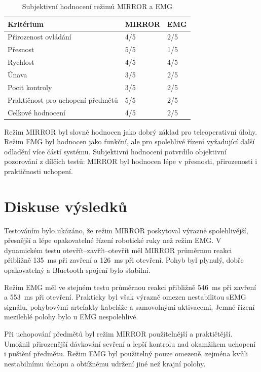 \begin{table}[htbp]
\centering
\caption{Subjektivní hodnocení režimů MIRROR a EMG}
\label{tab:subjektivni-hodnoceni}
\begin{tabular}{|p{}|p{}|p{}|}
\hline
\textbf{Kritérium} & \textbf{MIRROR} & \textbf{EMG} \\
\hline
Přirozenost ovládání & 4/5 & 2/5 \\
\hline
Přesnost & 5/5 & 1/5 \\
\hline
Rychlost & 4/5 & 4/5 \\
\hline
Únava & 3/5 & 2/5 \\
\hline
Pocit kontroly & 3/5 & 2/5 \\
\hline
Praktičnost pro uchopení předmětů & 5/5 & 2/5 \\
\hline
Celkové hodnocení & 4/5 & 2/5 \\
\hline
\end{tabular}
\end{table}

Režim MIRROR byl slovně hodnocen jako dobrý základ pro teleoperativní úlohy. Režim EMG byl hodnocen jako funkční, ale pro spolehlivé řízení vyžadující další odladění více částí systému. Subjektivní hodnocení potvrdilo objektivní pozorování z dílčích testů: MIRROR byl hodnocen lépe v přesnosti, přirozenosti i praktičnosti uchopení.

\section{Diskuse výsledků}
\label{sec:diskuse-vysledku}

Testováním bylo ukázáno, že režim MIRROR poskytoval výrazně spolehlivější, přesnější a lépe opakovatelné řízení robotické ruky než režim EMG\@. V dynamickém testu otevřít--zavřít--otevřít měl MIRROR průměrnou reakci přibližně 135~ms při zavření a 126~ms při otevření. Pohyb byl plynulý, dobře opakovatelný a Bluetooth spojení bylo stabilní.

Režim EMG měl ve stejném testu průměrnou reakci přibližně 546~ms při zavření a 553~ms při otevření. Prakticky byl však výrazně omezen nestabilitou sEMG signálu, pohybovými artefakty kabeláže a samovolnými aktivacemi. Jemné řízení mezilehlé polohy bylo u EMG nespolehlivé.

Při uchopování předmětů byl režim MIRROR použitelnější a praktičtější. Umožnil přirozenější dávkování sevření a lepší kontrolu nad okamžikem uchopení i puštění předmětu. Režim EMG byl použitelný pouze omezeně, zejména kvůli nestabilnímu úchopu a obtížnému udržení jiné než krajní polohy.

